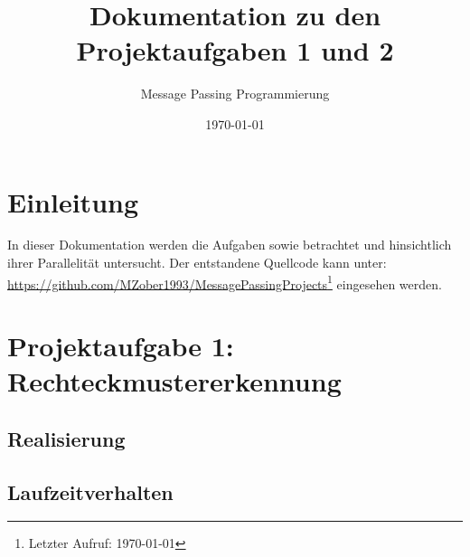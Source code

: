 	

\usepackage{pgfplots}
\usepackage{filecontents}
					
\title{Dokumentation zu den Projektaufgaben 1 und 2}
\subtitle{Message Passing Programmierung\vspace{1cm}}

\author{}
\date{\today}

\maketitle

\tableofcontents
\pagebreak

\section{Einleitung}
In dieser Dokumentation werden die Aufgaben  sowie  betrachtet und hinsichtlich ihrer Parallelität untersucht.
Der entstandene Quellcode kann unter:\\
\url{https://github.com/MZober1993/MessagePassingProjects}\footnote{Letzter Aufruf: \today}
eingesehen werden.
\section{Projektaufgabe 1: Rechteckmustererkennung}

\subsection{Realisierung}


\subsection{Laufzeitverhalten}


